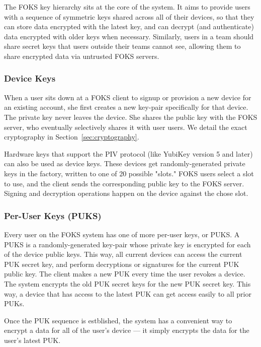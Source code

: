 The FOKS key hierarchy sits at the core of the system. It aims to provide users
with a sequence of symmetric keys shared across all of their devices, so that
they can store data encrypted with the latest key, and can decrypt (and
authenticate) data encrypted with older keys when necessary. Similarly, users in
a team should share secret keys that users outside their teams cannot see, allowing
them to share encrypted data via untrusted FOKS servers.

\subsubsection{Device Keys}

When a user sits down at a FOKS client to signup or provision a new device
for an existing account, she first creates a new key-pair specifically
for that device. The private key never leaves the device. She shares the public key
with the FOKS server, who eventually selectively shares it with user users.
We detail the exact cryptography in Section~\ref{sec:cryptography}.

Hardware keys that support the PIV protocol (like YubiKey version 5 and later)
can also be used as device keys. These devices get randomly-generated private
keys in the factory, written to one of 20 possible "slots." FOKS users select
a slot to use, and the client sends the corresponding public key to the FOKS 
server. Signing and decryption operations happen on the device against the chose
slot. 

\subsubsection{Per-User Keys (PUKS)}

Every user on the FOKS system has one of more per-user keys, or PUKS. A PUKS
is a randomly-generated key-pair whose private key is encrypted for each of
the device public keys. This way, all current devices can access the current
PUK secret key, and perform decryptions or signatures for the current PUK public
key. The client makes a new PUK every time the user revokes a device. The system
encrypts the old PUK secret keys for the new PUK secret key. This way,
a device that has access to the latest PUK can get access easily to all prior
PUKs.

Once the PUK sequence is estblished, the system has a convenient way to encrypt
a data for all of the user's device --- it simply encrypts the data for the 
user's latest PUK.

